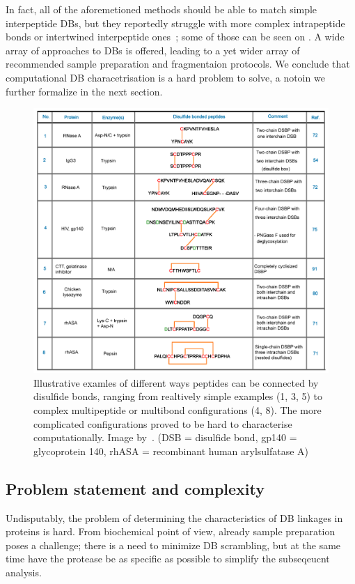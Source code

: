 In fact, all of the aforemetioned methods should be able to match simple interpeptide DBs, but they reportedly struggle with more complex intrapeptide bonds or intertwined interpeptide ones~\cite{lakbub2018recent}; some of those can be seen on . A wide array of approaches to DBs is offered, leading to a yet wider array of recommended sample preparation and fragmentaion protocols. We conclude that computational DB characetrisation is a hard problem to solve, a notoin we further formalize in the next section.

\begin{figure}
  \centering
  \includegraphics[width=1\linewidth]{img/bond-types.png}
  \caption{Illustrative examles of different ways peptides can be connected by disulfide bonds, ranging from realtively simple examples (1, 3, 5) to complex multipeptide or multibond configurations (4, 8). The more complicated configurations proved to be hard to characterise computationally. Image by~\citet{lakbub2018recent}. (DSB = disulfide bond, gp140 = glycoprotein 140, rhASA = recombinant human arylsulfatase A)}\label{fig:bond-types}
\end{figure}


\subsection{Problem statement and complexity}

Undisputably, the problem of determining the characteristics of DB linkages in proteins is hard. From biochemical point of view, already sample preparation poses a challenge; there is a need to minimize DB scrambling, but at the same time have the protease be as specific as possible to simplify the subseqeucnt analysis.

